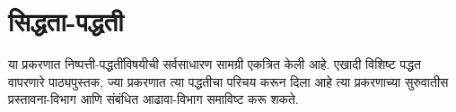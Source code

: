 \chapter{सिद्धता-पद्धती}\label{fol:prf::chap}
\begin{editorial}
या प्रकरणात निष्पत्ती-पद्धतींविषयीची सर्वसाधारण सामग्री
एकत्रित केली आहे. एखादी विशिष्ट पद्धत वापरणारे पाठ्यपुस्तक,
ज्या प्रकरणात त्या पद्धतीचा परिचय करून दिला आहे त्या प्रकरणाच्या
सुरुवातीस प्रस्तावना-विभाग आणि संबंधित आढावा-विभाग समाविष्ट करू शकते.
\end{editorial}
